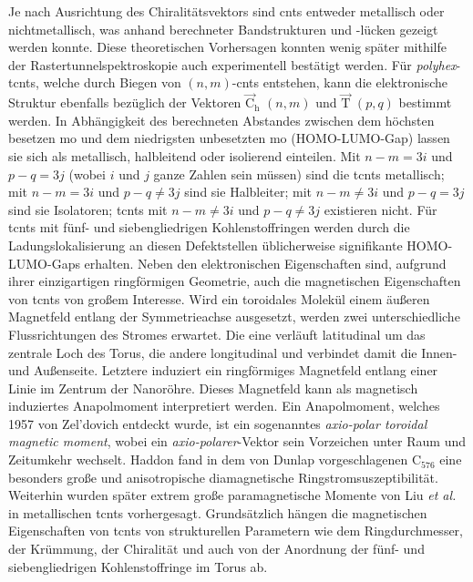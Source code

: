 Je nach Ausrichtung des Chiralitätsvektors sind \acp{cnt} entweder metallisch oder nichtmetallisch, was anhand berechneter Bandstrukturen und -lücken gezeigt werden konnte.\supercite{mintmire1992fullerene,hamada1992new,saito1992electronic,saito1998physical} Diese theoretischen Vorhersagen konnten wenig später mithilfe der Rastertunnelspektroskopie auch experimentell bestätigt werden.\supercite{wilder1998electronic} Für \textit{polyhex}-\acp{tcnt}, welche durch Biegen von $(n,m)$-\acp{cnt} entstehen, kann die elektronische Struktur ebenfalls bezüglich der Vektoren $\vec{\text{C}}_\text{h}$ $(n,m)$ und $\vec{\text{T}}$ $(p,q)$ bestimmt werden.\supercite{ceulemans2000electronic} In Abhängigkeit des berechneten Abstandes zwischen dem höchsten besetzen \ac{mo} und dem niedrigsten unbesetzten \ac{mo} (HOMO-LUMO-Gap) lassen sie sich als metallisch, halbleitend oder isolierend einteilen. Mit $n-m=3i$ und $p-q=3j$ (wobei $i$ und $j$ ganze Zahlen sein müssen) sind die \acp{tcnt} metallisch; mit $n-m=3i$ und $p-q\neq3j$ sind sie Halbleiter; mit $n-m\neq3i$ und $p-q=3j$ sind sie Isolatoren; \acp{tcnt} mit $n-m\neq3i$ und $p-q\neq3j$ existieren nicht.\supercite{zhang2005electronic} Für \acp{tcnt} mit fünf- und siebengliedrigen Kohlenstoffringen werden durch die Ladungslokalisierung an diesen Defektstellen üblicherweise signifikante HOMO-LUMO-Gaps erhalten.\supercite{meunier1998atomic,oh2000structures,yazgan2004electronic,wu2011density} Neben den elektronischen Eigenschaften sind, aufgrund ihrer einzigartigen ringförmigen Geometrie, auch die magnetischen Eigenschaften von \acp{tcnt} von großem Interesse. Wird ein toroidales Molekül einem äußeren Magnetfeld entlang der Symmetrieachse ausgesetzt, werden zwei unterschiedliche Flussrichtungen des Stromes erwartet.\supercite{sundholm2016calculations} Die eine verläuft latitudinal um das zentrale Loch des Torus, die andere longitudinal und verbindet damit die Innen- und Außenseite. Letztere induziert ein ringförmiges Magnetfeld entlang einer Linie im Zentrum der Nanoröhre. Dieses Magnetfeld kann als magnetisch induziertes Anapolmoment interpretiert werden.\supercite{berger2012prediction,ceulemans1998molecular,pelloni2011magnetic} Ein Anapolmoment, welches 1957 von Zel'dovich\supercite{zel1958electromagnetic} entdeckt wurde, ist ein sogenanntes \textit{axio-polar toroidal magnetic moment}\supercite{ascher1966some}, wobei ein \textit{axio-polarer}-Vektor sein Vorzeichen unter Raum und Zeitumkehr wechselt.\supercite{schmid2001ferrotoroidics} Haddon fand in dem von Dunlap vorgeschlagenen C$_{576}$ eine besonders große und anisotropische diamagnetische Ringstromsuszeptibilität.\supercite{haddon1997electronic} Weiterhin wurden später extrem große paramagnetische Momente von Liu \textit{et al.}\supercite{liu2002colossal} in metallischen \acp{tcnt} vorhergesagt. Grundsätzlich hängen die magnetischen Eigenschaften von \acp{tcnt} von strukturellen Parametern wie dem Ringdurchmesser, der Krümmung, der Chiralität und auch von der Anordnung der fünf- und siebengliedrigen Kohlenstoffringe im Torus ab.\supercite{tsai2004magnetization,liu2007magnetic,liu2008magnetic}\\

